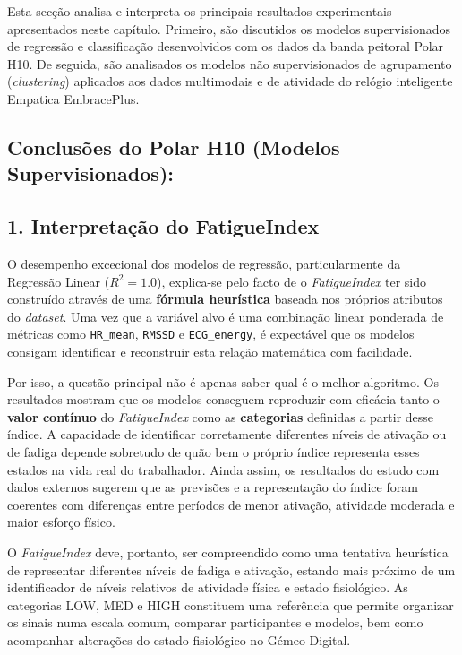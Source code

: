 Esta secção analisa e interpreta os principais resultados experimentais apresentados neste capítulo. Primeiro, são discutidos os modelos supervisionados de regressão e classificação desenvolvidos com os dados da banda peitoral Polar H10. De seguida, são analisados os modelos não supervisionados de agrupamento (\textit{clustering}) aplicados aos dados multimodais e de atividade do relógio inteligente Empatica EmbracePlus.

\subsection*{Conclusões do Polar H10 (Modelos Supervisionados):}

\subsection*{1. Interpretação do FatigueIndex}

O desempenho excecional dos modelos de regressão, particularmente da Regressão Linear ($R^{2} = 1.0$), explica-se pelo facto de o \textit{FatigueIndex} ter sido construído através de uma \textbf{fórmula heurística} baseada nos próprios atributos do \textit{dataset}. Uma vez que a variável alvo é uma combinação linear ponderada de métricas como \texttt{HR\_mean}, \texttt{RMSSD} e \texttt{ECG\_energy}, é expectável que os modelos consigam identificar e reconstruir esta relação matemática com facilidade.

Por isso, a questão principal não é apenas saber qual é o melhor algoritmo. Os resultados mostram que os modelos conseguem reproduzir com eficácia tanto o \textbf{valor contínuo} do \textit{FatigueIndex} como as \textbf{categorias} definidas a partir desse índice. A capacidade de identificar corretamente diferentes níveis de ativação ou de fadiga depende sobretudo de quão bem o próprio índice representa esses estados na vida real do trabalhador. Ainda assim, os resultados do estudo com dados externos sugerem que as previsões e a representação do índice foram coerentes com diferenças entre períodos de menor ativação, atividade moderada e maior esforço físico.

O \textit{FatigueIndex} deve, portanto, ser compreendido como uma tentativa heurística de representar diferentes níveis de fadiga e ativação, estando mais próximo de um identificador de níveis relativos de atividade física e estado fisiológico. As categorias LOW, MED e HIGH constituem uma referência que permite organizar os sinais numa escala comum, comparar participantes e modelos, bem como acompanhar alterações do estado fisiológico no Gémeo Digital.

